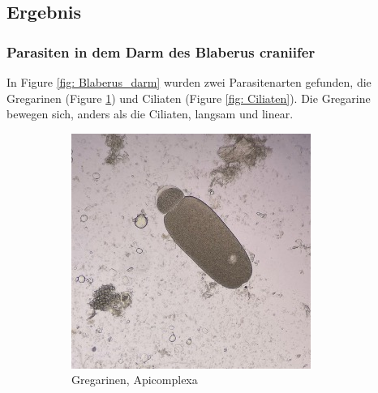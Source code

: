 \documentclass[oneside,10pt,a4paper]{report}
\begin{document}
			
			\subsection{Ergebnis}
				\subsubsection{Parasiten in dem Darm des Blaberus craniifer}
					In Figure \ref{fig: Blaberus_darm} wurden zwei Parasitenarten gefunden, die Gregarinen (Figure \ref{fig:Apicomplexa}) und Ciliaten (Figure \ref{fig: Ciliaten}).
					Die Gregarine bewegen sich, anders als die Ciliaten, langsam und linear.
					\begin{figure}[H]
						\centering
						\begin{subfigure}[b]{0.46\textwidth}
							\includegraphics[width=\textwidth]{apicomplexa.jpg}
							\caption{Gregarinen, Apicomplexa}
							\label{fig:Apicomplexa}
						\end{subfigure}
						\hfill
						\begin{subfigure}[b]{0.5\textwidth}

\end{subfigure}
\end{figure}
\end{document}

